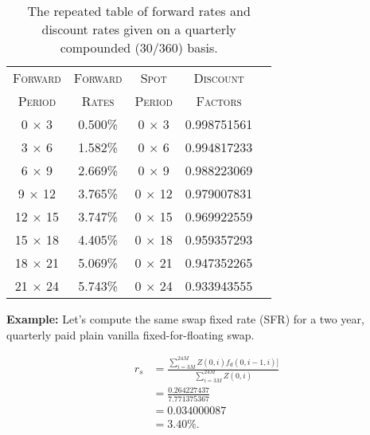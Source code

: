 \begin{table}[ht]
\begin{center}
\begin{tabular}{ccccc}

\toprule
\textsc{Forward} & \textsc{Forward} & \textsc{Spot} & \textsc{Discount} \\
\textsc{Period} & \textsc{Rates} & \textsc{Period} & \textsc{Factors}\\
\toprule

0 $\times$ 3 & 0.500\% & 0 $\times$ 3 & 0.998751561 \\
3 $\times$ 6 & 1.582\% & 0 $\times$ 6 & 0.994817233 \\
6 $\times$ 9 & 2.669\% & 0 $\times$ 9 & 0.988223069 \\
9 $\times$ 12 & 3.765\% & 0 $\times$ 12 & 0.979007831 \\
12 $\times$ 15 & 3.747\% & 0 $\times$ 15 & 0.969922559 \\
15 $\times$ 18 & 4.405\% & 0 $\times$ 18 & 0.959357293 \\
18 $\times$ 21 & 5.069\% & 0 $\times$ 21 & 0.947352265 \\
21 $\times$ 24 & 5.743\% & 0 $\times$ 24 & 0.933943555 \\
\toprule

\end{tabular}
\end{center}
\caption[Numerical Example--Swap Pricing using Forward Rates]{The repeated table of forward rates and discount rates given on a quarterly compounded (30/360) basis.}
\label{tab:numerical_ex_4}
\end{table}

\textbf{Example:}
Let's compute the same swap fixed rate (SFR) for a two year, quarterly paid plain vanilla fixed-for-floating swap.

\begin{align}
    r_s &= \frac{\sum_{i=3M}^{24M} Z(0,i) f_d(0,i-1,i)]}{\sum_{i = 3M}^{24M} Z(0, i)} \\[6pt]
    &= \frac{0.264227437}{7.771375367} \\
    &= 0.034000087 \\
    &= 3.40\%.
\end{align}